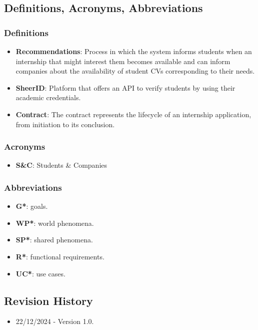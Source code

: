\subsection{Definitions, Acronyms, Abbreviations}

\subsubsection{Definitions}
\begin{itemize}
    \item \textbf{Recommendations}: Process in which the system informs students when an internship that might interest them becomes available and can inform companies about the availability of student CVs corresponding to their needs.
    \item \textbf{SheerID}\cite{sheerid}: Platform that offers an API to verify students by using their academic credentials.
    \item \textbf{Contract}: The contract represents the lifecycle of an internship application, from initiation to its conclusion.
\end{itemize}
\subsubsection{Acronyms}
\begin{itemize}
    \item \textbf{S\&C}: Students \& Companies
\end{itemize}
\subsubsection{Abbreviations}
\begin{itemize}
    \item \textbf{G*}: goals.
    \item \textbf{WP*}: world phenomena.
    \item \textbf{SP*}: shared phenomena.
    \item \textbf{R*}: functional requirements.
    \item \textbf{UC*}: use cases.
\end{itemize}
\subsection{Revision History}
\begin{itemize}
    \item 22/12/2024 - Version 1.0.
\end{itemize}
